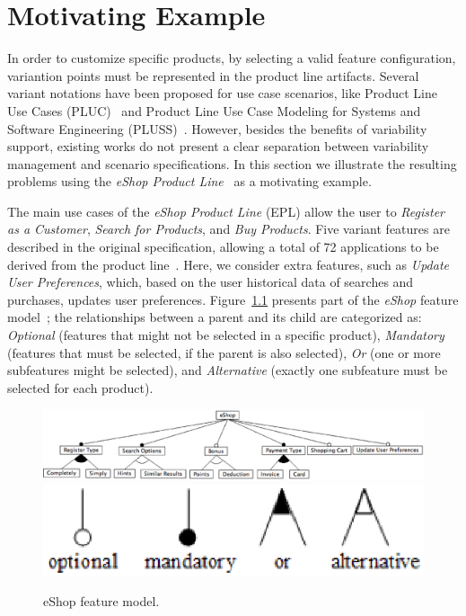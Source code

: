 \documentclass[11pt]{report}
\begin{document}
\chapter{Motivating Example}
\label{chapter:example}

In order to customize specific products, by selecting a valid feature
configuration, variantion points must be represented in the product line
artifacts. Several variant notations have been proposed for use case scenarios,
like  Product Line Use Cases (PLUC)~\cite{bertolino-esec-2003} and Product Line
Use Case Modeling for Systems and Software Engineering
(PLUSS)~\cite{eriksson-splc-2005}. However, besides the benefits of variability
support, existing works do not present a clear separation between variability
management and scenario specifications. In this section we illustrate the
resulting problems using the \emph{eShop Product Line}~\cite{eshop-url} as a
motivating example.

The main use cases of the \emph{eShop Product Line} (EPL) allow the user to
\emph{Register as a Customer}, \emph{Search for Products}, and \emph{Buy
Products}.  Five variant features are described in the original specification,
allowing a total  of 72 applications to be derived from the product
line~\cite{eshop-url}. Here, we consider extra features, such as \emph{Update
User Preferences}, which, based on the user historical data of searches and
purchases, updates user preferences. Figure~\ref{fig:eshop-fm} presents part of
the \emph{eShop} feature model~\cite{gheyi-alloy-06,czarnecki-book}; the
relationships between a parent and its child are categorized as: \emph{Optional}
(features that might not be selected in a specific product), \emph{Mandatory}
(features that must be selected, if the parent is also selected), \emph{Or} (one
or more subfeatures might be selected), and \emph{Alternative} (exactly one
subfeature must be selected for each product).

 \begin{figure}[h]
 \begin{center}
  \includegraphics[scale=0.25]{img/eShop-fm3.eps}
   \includegraphics[scale=0.30]{img/fm-notation.eps}
   \caption{eShop feature model.}
  \label{fig:eshop-fm}
  \end{center}
\end{figure}
\end{document}

